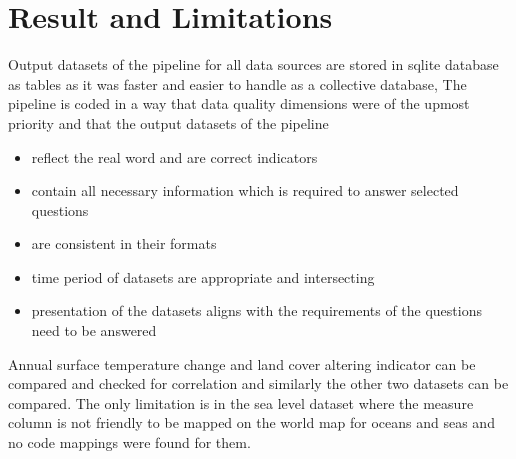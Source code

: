 \documentclass[a4paper,11pt]{article}
\begin{document}
\section{Result and Limitations}
Output datasets of the pipeline for all data sources are stored in sqlite database as tables as it was faster and easier to handle as a collective database, The pipeline is coded in a way that data quality dimensions were of the upmost priority and that the output datasets of the pipeline 
\begin{itemize}
    \item reflect the real word and are correct indicators
    \item contain all necessary information which is required to answer selected questions
    \item are consistent in their formats
    \item time period of datasets are appropriate and intersecting
    \item presentation of the datasets aligns with the requirements of the questions need to be answered
\end{itemize}

Annual surface temperature change and land cover altering indicator can be compared and checked for correlation and similarly the other two datasets can be compared. The only limitation is in the sea level dataset where the measure column is not friendly to be mapped on the world map for oceans and seas and no code mappings were found for them.



\end{document}
